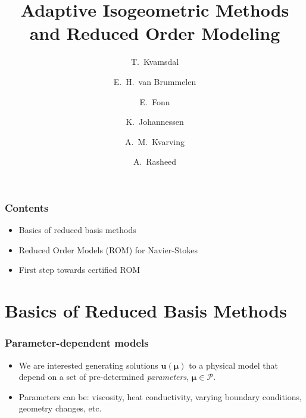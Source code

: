\documentclass{beamer}
\begin{document}
\title[Reduced Order Models]{
  Adaptive Isogeometric Methods \\ and Reduced Order Modeling
}
\author[T.~Kvamsdal]{
  T.~Kvamsdal \and
  E.~H.~van Brummelen \and
  E.~Fonn \and
  K.~Johannessen \and
  A.~M.~Kvarving \and
  A.~Rasheed \and
}
\date[IGA 2018]{}


\begin{frame}
  \titlepage
\end{frame}

\begin{frame}
  \frametitle{Contents}

  \begin{itemize}
  \item Basics of reduced basis methods
  \item Reduced Order Models (ROM) for Navier-Stokes
  \item First step towards certified ROM
  \end{itemize}
\end{frame}

\section{Basics of Reduced Basis Methods}

\begin{frame}
  \frametitle{Parameter-dependent models}

  \begin{center}
  \end{center}

  \begin{itemize}
  \item We are interested generating solutions $\bm u(\bm \mu)$ to a physical
    model that depend on a set of pre-determined \emph{parameters},
    $\bm\mu \in \mathcal{P}$.
  \item Parameters can be: viscosity, heat conductivity, varying boundary conditions, geometry
    changes, etc.
  \end{itemize}
\end{frame}
\end{document}
